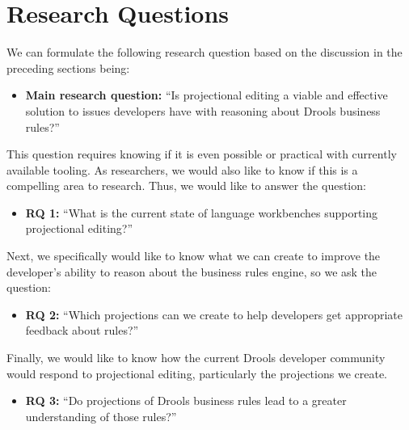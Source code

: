 \section{Research Questions}
\label{section:Research_Questions}

We can formulate the following research question based on the discussion in the preceding sections being:

\begin{itemize}
    \setlength\itemsep{0em}
    \item \textbf{Main research question:} ``Is projectional editing a viable and effective solution to issues developers have with reasoning about Drools business rules?''
\end{itemize}

This question requires knowing if it is even possible or practical with currently available tooling. 
As researchers, we would also like to know if this is a compelling area to research. 
Thus, we would like to answer the question:
\begin{itemize}
    \setlength\itemsep{0em}
    \item \textbf{RQ 1:} ``What is the current state of language workbenches supporting projectional editing?''
\end{itemize}

Next, we specifically would like to know what we can create to improve the developer's ability to reason about the business rules engine, so we ask the question:
\begin{itemize}
    \setlength\itemsep{0em}
    \item \textbf{RQ 2:} ``Which projections can we create to help developers get appropriate feedback about rules?''
\end{itemize}

Finally, we would like to know how the current Drools developer community would respond to projectional editing, particularly the projections we create.
\begin{itemize}
    \setlength\itemsep{0em}
    \item  \textbf{RQ 3:} ``Do projections of Drools business rules lead to a greater understanding of those rules?''
\end{itemize}